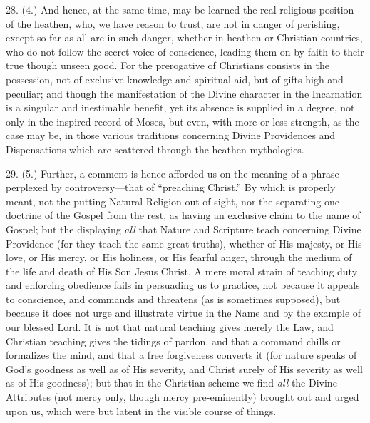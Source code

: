 28. (4.) And hence, at the same time, may be learned the real
religious position of the heathen, who, we have reason to trust, are
not in danger of perishing, except so far as all are in such danger,
whether in heathen or Christian countries, who do not follow the
secret voice of conscience, leading them on by faith to their true
though unseen good. For the prerogative of Christians consists in the
possession, not of exclusive knowledge and spiritual aid, but of gifts
high and peculiar; and though the manifestation of the Divine
character in the Incarnation is a singular and inestimable benefit,
yet its absence is supplied in a degree, not only in the inspired
record of Moses, but even, with more or less strength, as the case may
be, in those various traditions concerning Divine Providences and
Dispensations which are scattered through the heathen mythologies.

29. (5.) Further, a comment is hence afforded us on the meaning of
a phrase perplexed by controversy—that of ``preaching
Christ.'' By which is properly meant, not the putting Natural
Religion out of sight, nor the separating one doctrine of the Gospel
from the rest, as having an exclusive claim to the name of Gospel; but
the displaying \emph{all} that Nature and Scripture teach concerning
Divine Providence (for they teach the same great truths), whether of
His majesty, or His love, or His mercy, or His holiness, or His
fearful anger, through the medium of the life and death of His Son
Jesus Christ. A mere moral strain of teaching duty and enforcing
obedience fails in persuading us to practice, not because it appeals
to conscience, and commands and threatens (as is sometimes supposed),
but because it does not urge and illustrate virtue in the Name and by
the example of our blessed Lord. It is not that natural teaching gives
merely the Law, and Christian teaching gives the tidings of pardon,
and that a command chills or formalizes the mind, and that a free
forgiveness converts it (for nature speaks of God's goodness as well
as of His severity, and Christ surely of His severity as well as of
His goodness); but that in the Christian scheme we find \emph{all} the
Divine Attributes (not mercy only, though mercy pre-eminently) brought
out and urged upon us, which were but latent in the visible course of
things.

